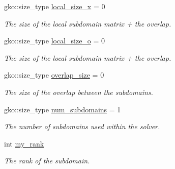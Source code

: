 \begin{DoxyCompactItemize}
gko\+::size\+\_\+type \hyperlink{structSchwarzWrappers_1_1Metadata_a6eab30e376a7ee881a031f7fc1df6153}{local\+\_\+size\+\_\+x} = 0
\begin{DoxyCompactList}\small\item\em The size of the local subdomain matrix + the overlap. \end{DoxyCompactList}\item 
\mbox{\label{structSchwarzWrappers_1_1Metadata_a76574046d23e8f13d03e9710fe595a27}} 
gko\+::size\+\_\+type \hyperlink{structSchwarzWrappers_1_1Metadata_a76574046d23e8f13d03e9710fe595a27}{local\+\_\+size\+\_\+o} = 0
\begin{DoxyCompactList}\small\item\em The size of the local subdomain matrix + the overlap. \end{DoxyCompactList}\item 
\mbox{\label{structSchwarzWrappers_1_1Metadata_ad15592ee4d16cbb9bd6d2eba160acca2}} 
gko\+::size\+\_\+type \hyperlink{structSchwarzWrappers_1_1Metadata_ad15592ee4d16cbb9bd6d2eba160acca2}{overlap\+\_\+size} = 0
\begin{DoxyCompactList}\small\item\em The size of the overlap between the subdomains. \end{DoxyCompactList}\item 
\mbox{\label{structSchwarzWrappers_1_1Metadata_aea4e5889da52417ef54fe3cad0bd547e}} 
gko\+::size\+\_\+type \hyperlink{structSchwarzWrappers_1_1Metadata_aea4e5889da52417ef54fe3cad0bd547e}{num\+\_\+subdomains} = 1
\begin{DoxyCompactList}\small\item\em The number of subdomains used within the solver. \end{DoxyCompactList}\item 
\mbox{\label{structSchwarzWrappers_1_1Metadata_a0d2e753bbdb3bf73653f5901f36a2edc}} 
int \hyperlink{structSchwarzWrappers_1_1Metadata_a0d2e753bbdb3bf73653f5901f36a2edc}{my\+\_\+rank}
\begin{DoxyCompactList}\small\item\em The rank of the subdomain. \end{DoxyCompactList}\item 

\end{DoxyCompactItemize}
